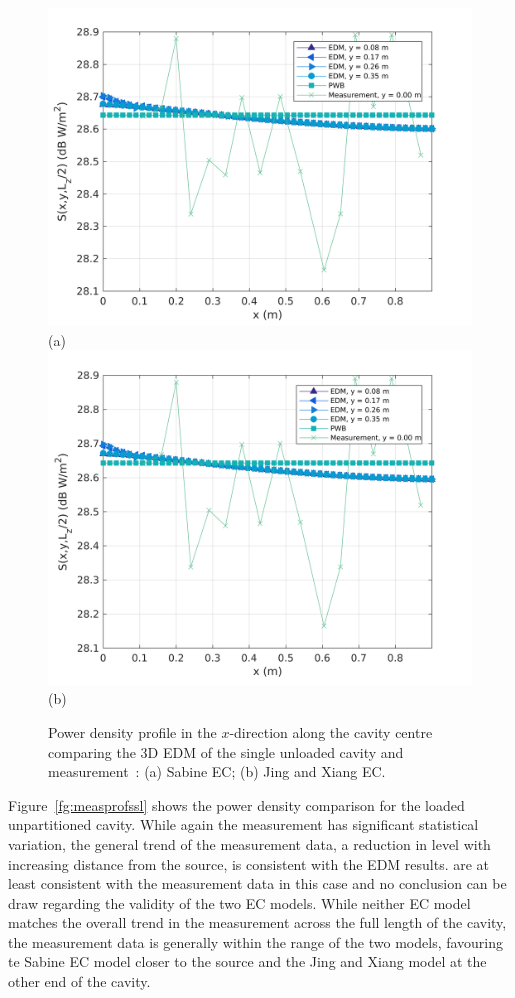 \documentclass[a4paper]{article}
\numberwithin{equation}{section}
\newcounter{Figure}
\begin{document}
\begin{figure}[hp]
\begin{center}
\includegraphics[width=0.6\linewidth]{figures/SDM_3D_SU_PowerDensityProfileXMeas}\\
{\footnotesize (a)}\\
\vspace{2mm}
\includegraphics[width=0.6\linewidth]{figures/SDM_3D_SU_PowerDensityProfileXMeas_JX}\\
{\footnotesize (b)}\\
\vspace{-2mm}
\caption{\label{fg:measprofssu} Power density profile in the $x$-direction along the cavity centre comparing
the 3D EDM of the single unloaded cavity and measurement~\citep{Flintoft2017b}: (a) Sabine EC; (b) Jing and Xiang EC.}
\end{center}
\end{figure}

Figure~\ref{fg:measprofssl} shows the power density comparison for the loaded unpartitioned cavity. While again the 
measurement has significant statistical variation, the general trend of the measurement data, a reduction in level
with increasing distance from the source, is consistent with the EDM results.  are at least consistent with the measurement data
in this case and no conclusion can be draw regarding the validity of the two EC models. While neither EC model matches 
the overall trend in the measurement across the full length of the cavity, the measurement data is generally within
the range of the two models, favouring te Sabine EC model closer to the source and the Jing and Xiang model at the other
end of the cavity.
\end{document}
